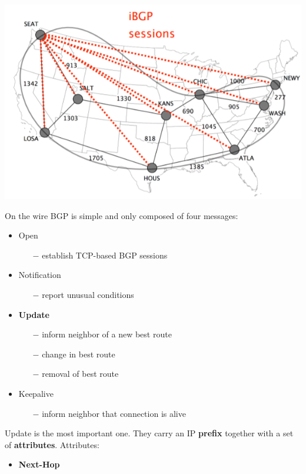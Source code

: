 \documentclass[a4paper, fontsize=8pt, landscape, DIV=1]{scrartcl}
\begin{document}
\begin{multicols*}{4}
\begin{itemize}[noitemsep]
\begin{itemize}
				\includegraphics[width=0.8\columnwidth]{images/Network_Layer/iBGP_session.png}
			\end{itemize}
		\end{itemize}        
		On the wire BGP is simple and only composed of four messages: 
		\begin{itemize}[noitemsep]
			\item Open 
			\begin{itemize}
				\item[$-$] establish TCP-based BGP sessions
			\end{itemize} 
			\item Notification 
			\begin{itemize}
				\item[$-$] report unusual conditions 
			\end{itemize}
			\item \textbf{Update} 
			\begin{itemize}
				\item[$-$] inform neighbor of a new best route
				\item[$-$] change in best route
				\item[$-$] removal of best route
			\end{itemize} 
			\item Keepalive
			\begin{itemize}
				\item[$-$] inform neighbor that connection is alive
			\end{itemize}
		\end{itemize}
		Update is the most important one. They carry an IP \textbf{prefix} together
		with a set of \textbf{attributes}. Attributes: 
		\begin{itemize}[noitemsep]
			\item \textbf{Next-Hop}
			\begin{itemize}

\end{itemize}
\end{itemize}
\end{multicols*}
\end{document}
